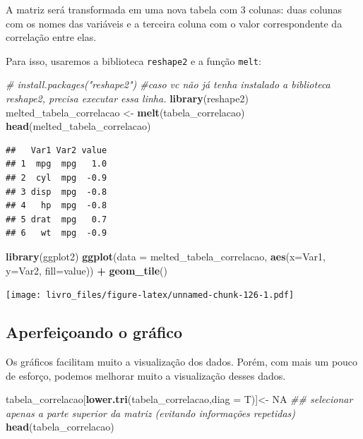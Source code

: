 \documentclass[
]{book}
\newenvironment{Shaded}{\begin{snugshade}}{\end{snugshade}}
\newcommand{\CommentTok}[1]{\textcolor[rgb]{0.56,0.35,0.01}{\textit{#1}}}
\newcommand{\DataTypeTok}[1]{\textcolor[rgb]{0.13,0.29,0.53}{#1}}
\newcommand{\KeywordTok}[1]{\textcolor[rgb]{0.13,0.29,0.53}{\textbf{#1}}}
\newcommand{\NormalTok}[1]{#1}
\newcommand{\OperatorTok}[1]{\textcolor[rgb]{0.81,0.36,0.00}{\textbf{#1}}}
\newcommand{\OtherTok}[1]{\textcolor[rgb]{0.56,0.35,0.01}{#1}}
\newcommand{\StringTok}[1]{\textcolor[rgb]{0.31,0.60,0.02}{#1}}
\begin{document}
A matriz será transformada em uma nova tabela com 3 colunas: duas
colunas com os nomes das variáveis e a terceira coluna com o valor
correspondente da correlação entre elas.

Para isso, usaremos a biblioteca \texttt{reshape2} e a função
\texttt{melt}:

\begin{Shaded}
\begin{Highlighting}[]
\CommentTok{# install.packages("reshape2")  #caso vc não já tenha instalado a biblioteca reshape2, precisa executar essa linha.}
\KeywordTok{library}\NormalTok{(reshape2)}
\NormalTok{melted_tabela_correlacao <-}\StringTok{ }\KeywordTok{melt}\NormalTok{(tabela_correlacao)}
\KeywordTok{head}\NormalTok{(melted_tabela_correlacao)}
\end{Highlighting}
\end{Shaded}

\begin{verbatim}
##   Var1 Var2 value
## 1  mpg  mpg   1.0
## 2  cyl  mpg  -0.9
## 3 disp  mpg  -0.8
## 4   hp  mpg  -0.8
## 5 drat  mpg   0.7
## 6   wt  mpg  -0.9
\end{verbatim}

\begin{Shaded}
\begin{Highlighting}[]
\KeywordTok{library}\NormalTok{(ggplot2)}
\KeywordTok{ggplot}\NormalTok{(}\DataTypeTok{data =}\NormalTok{ melted_tabela_correlacao, }\KeywordTok{aes}\NormalTok{(}\DataTypeTok{x=}\NormalTok{Var1, }\DataTypeTok{y=}\NormalTok{Var2, }\DataTypeTok{fill=}\NormalTok{value)) }\OperatorTok{+}\StringTok{ }
\StringTok{  }\KeywordTok{geom_tile}\NormalTok{()}
\end{Highlighting}
\end{Shaded}

\texttt{[image: livro\_files/figure-latex/unnamed-chunk-126-1.pdf]}

\hypertarget{aperfeiuxe7oando-o-gruxe1fico}{%
\subsection{Aperfeiçoando o
gráfico}\label{aperfeiuxe7oando-o-gruxe1fico}}

Os gráficos facilitam muito a visualização dos dados. Porém, com mais um
pouco de esforço, podemos melhorar muito a visualização desses dados.

\begin{Shaded}
\begin{Highlighting}[]
\NormalTok{tabela_correlacao[}\KeywordTok{lower.tri}\NormalTok{(tabela_correlacao,}\DataTypeTok{diag =}\NormalTok{ T)]<-}\StringTok{ }\OtherTok{NA} \CommentTok{## selecionar apenas a parte superior da matriz (evitando informações repetidas)}
\KeywordTok{head}\NormalTok{(tabela_correlacao)}
\end{Highlighting}
\end{Shaded}
\end{document}

